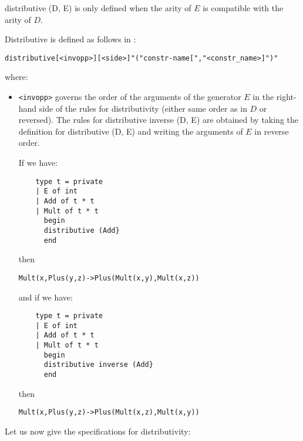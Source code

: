 \begin{remark}
distributive (D, E) is only defined when the arity of $E$ is
compatible with the arity of $D$.
  
\end{remark}

Distributive is defined as follows in :
\begin{alltt}
  distributive [<invopp>] [<side>] "(" constr-name ["," <constr_name>]  ")"
\end{alltt}
where:
\begin{itemize}
\item \verb&<invopp>& governs the order of the arguments of the
  generator $E$ in the right-hand side of the rules for
  distributivity (either same order as in $D$ or reversed).
  The rules for distributive inverse (D, E) are obtained by taking the
  definition for distributive (D, E) and writing the arguments of $E$
  in reverse order.

  If we have:  
  \begin{lstlisting}
    type t = private
    | E of int
    | Add of t * t
    | Mult of t * t
      begin
      distributive (Add}
      end
    \end{lstlisting}
    then
    \begin{alltt}
      Mult (x, Plus (y, z) -> Plus (Mult (x, y), Mult (x, z))
    \end{alltt}
    and if we have:
    \begin{lstlisting}
    type t = private
    | E of int
    | Add of t * t
    | Mult of t * t
      begin
      distributive inverse (Add}
      end
    \end{lstlisting}
    then
    \begin{alltt}
      Mult (x, Plus (y, z) -> Plus (Mult (x, z), Mult (x, y))
    \end{alltt}
\end{itemize}

Let us now give the specifications for distributivity:

